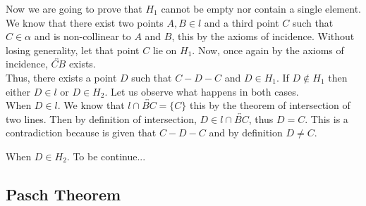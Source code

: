 \documentclass[11pt]{article}
\begin{document}
        Now we are going to prove that $H_1$ cannot be empty nor contain a single element. We know that there exist two points $A, B \in l$ and a third point $C$ such that $C \in \alpha$ and is non-collinear to $A$ and $B$, this by the axioms of incidence. Without losing generality, let that point $C$ lie on $H_1$. Now, once again by the axioms of incidence, $\overleftrightarrow{CB}$ exists.\\
        Thus, there exists a point $D$ such that $ C - D - C$ and $D \in H_1$. If $D \not \in H_1$ then either $D \in l$ or $D \in H_2$. Let us observe what happens in both cases.\\

        When $D \in l$. We know that $l \cap \overleftrightarrow{BC} = \{C\}$ this by the theorem of intersection of two lines. Then by definition of intersection, $D \in l \cap \overleftrightarrow{BC}$, thus $D = C$. This is a contradiction because is given that $C - D -C$ and by definition $D \not = C$.

        When $D \in H_2$. To be continue...

    \subsection{Pasch Theorem}
\end{document}
